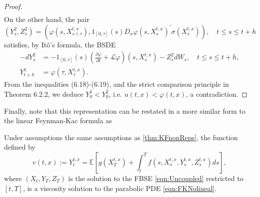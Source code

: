\begin{proof}
$$\begin{aligned}
\end{aligned}
$$
On the other hand, the pair
$$
\left(Y_s^2, Z_s^2\right)=\left(\varphi\left(s, X_{s \wedge \tau}^{t, x}\right), 1_{[0, \tau]}(s) D_x \varphi\left(s, X_s^{t, x}\right)^{\prime} \sigma\left(X_s^{t, x}\right)\right), \quad t \leq s \leq t+h
$$
satisfies, by Itô's formula, the BSDE
$$
\begin{aligned}
	-d Y_s^2 & =-1_{[0, \tau]}(s)\left(\frac{\partial \varphi}{\partial t}+\mathcal{L} \varphi\right)\left(s, X_s^{t, x}\right)-Z_s^2 d W_s, \quad t \leq s \leq t+h, \\
	Y_{t+h}^1 & =\varphi\left(\tau, X_\tau^{t, x}\right) .
\end{aligned}
$$
From the inequalities (6.18)-(6.19), and the strict comparison principle in Theorem 6.2.2, we deduce $Y_0^1<Y_0^2$, i.e. $u(t, x)<\varphi(t, x)$, a contradiction.
\end{proof}
Finally, note that this representation can be restated in a more similar form to the linear Feynman-Kac formula as
\begin{theorem}[]
	Under assumptions the same assumptions as \ref{thm:KFnonReps}, the function defined by 
	\begin{equation}
		v(t, x):=Y_t^{t, x}=\mathbb{E}\left[g\left(X_T^{t, x}\right)+\int_t^T f\left(s, X_s^{t, x}, Y_s^{t, x}, Z_s^{t, x}\right) d s\right],
	\end{equation}
where $(X_t,Y_T,Z_T)$ is the solution to the FBSE \ref{eqn:Uncoupled} restricted to $[t,T]$, is a viscosity solution to the parabolic PDE \eqref{eqn:FKNolineal}.
\end{theorem}

